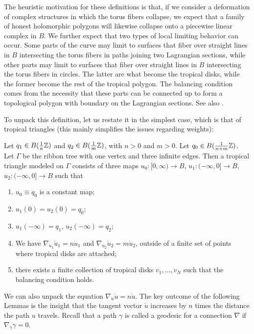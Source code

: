 \documentclass[12pt]{amsart}
\begin{document}
The heuristic motivation for these definitions is that, if we consider a deformation of complex structures in which the torus fibers collapse, we expect that a family of honest holomorphic polygons will likewise collapse onto a piecewise linear complex in $B$. We further expect that two types of local limiting behavior can occur. Some parts of the curve may limit to surfaces that fiber over straight lines in $B$ intersecting the torus fibers in paths joining two Lagrangian sections, while other parts may limit to surfaces that fiber over straight lines in $B$ intersecting the torus fibers in circles. The latter are what become the tropical disks, while the former become the rest of the tropical polygon. The balancing condition comes from the necessity that these parts can be connected up to form a topological polygon with boundary on the Lagrangian sections. See also \cite[Ch. 8]{d-branes-book}.

To unpack this definition, let us restate it in the simplest case,
which is that of tropical triangles (this mainly simplifies the issues
regarding weights): 

\begin{proposition}
  \label{prop:tropical-triangles}
  Let $q_1 \in B(\frac{1}{n}\mathbb{Z})$ and $q_2 \in B(\frac{1}{m}\mathbb{Z})$, with
  $n > 0$ and $m > 0$. Let $q_0 \in B(\frac{1}{n+m}\mathbb{Z})$. Let $\Gamma$
  be the ribbon tree with one vertex and three infinite edges. Then a
  tropical triangle modeled on $\Gamma$ consists of three
  maps $u_0: [0,\infty) \to B$, $u_1: (-\infty,0] \to B$, $u_2:
  (-\infty,0] \to B$ such that
  \begin{enumerate}
  \item $u_0 \equiv q_0$ is a constant map;
  \item $u_1(0) = u_2(0) = q_0$;
  \item $u_1(-\infty) = q_1$, $u_2(-\infty) = q_2$;
  \item We have $\nabla_{\dot{u}_1} \dot{u}_1 =
    n\dot{u}_1$ and $\nabla_{\dot{u}_2} \dot{u}_2 = m\dot{u}_2$, outside
    of a finite set of points where tropical disks are attached;
  \item there exists a finite collection of tropical disks
    $v_1,\dots,v_N$ such that the balancing condition holds.
  \end{enumerate}
\end{proposition}

We can also unpack the equation $\nabla_{\dot{u}} \dot{u} =
n\dot{u}$. The key outcome of the following Lemmas is the insight that
the tangent vector $\dot{u}$ increases by $n$ times the distance the
path $u$ travels. Recall that a path $\gamma$ is called a geodesic for a connection $\nabla$ if $\nabla_{\dot{\gamma}} \dot{\gamma} = 0$.
\end{document}
